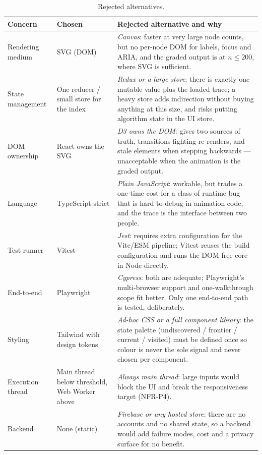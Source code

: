 \documentclass[11pt,a4paper]{article}
\begin{document}
\begin{table}[H]
\centering
\small
\setlength{\tabcolsep}{4pt}
\begin{tabular}{@{}L{3.4cm}L{2.9cm}L{8.7cm}@{}}
\toprule
\textbf{Concern} & \textbf{Chosen} & \textbf{Rejected alternative and why} \\
\midrule
Rendering medium & SVG (DOM) & \emph{Canvas}: faster at very large node counts, but no per-node
DOM for labels, focus and ARIA, and the graded output is at $n\le 200$, where SVG is sufficient. \\
State management & One reducer / small store for the index & \emph{Redux or a large store}: there is
exactly one mutable value plus the loaded trace; a heavy store adds indirection without buying
anything at this size, and risks putting algorithm state in the UI store. \\
DOM ownership & React owns the SVG & \emph{D3 owns the DOM}: gives two sources of truth,
transitions fighting re-renders, and stale elements when stepping backwards --- unacceptable when
the animation is the graded output. \\
Language & TypeScript strict & \emph{Plain JavaScript}: workable, but trades a one-time cost for a
class of runtime bug that is hard to debug in animation code, and the trace is the interface
between two people. \\
Test runner & Vitest & \emph{Jest}: requires extra configuration for the Vite/ESM pipeline;
Vitest reuses the build configuration and runs the DOM-free core in Node directly. \\
End-to-end & Playwright & \emph{Cypress}: both are adequate; Playwright's multi-browser support and
one-walkthrough scope fit better. Only one end-to-end path is tested, deliberately. \\
Styling & Tailwind with design tokens & \emph{Ad-hoc CSS or a full component library}: the state
palette (undiscovered / frontier / current / visited) must be defined once so colour is never the
sole signal and never chosen per component. \\
Execution thread & Main thread below threshold, Web Worker above & \emph{Always main thread}:
large inputs would block the UI and break the responsiveness target (NFR-P4). \\
Backend & None (static) & \emph{Firebase or any hosted store}: there are no accounts and no shared
state, so a backend would add failure modes, cost and a privacy surface for no benefit. \\
\bottomrule
\end{tabular}
\caption{Rejected alternatives.}
\end{table}
\end{document}
